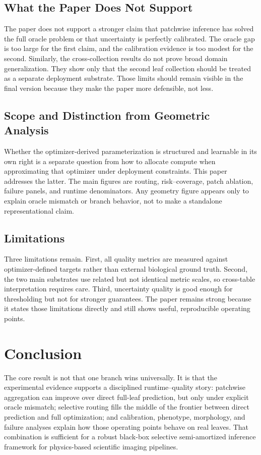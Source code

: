 \documentclass[11pt,a4paper]{article}
\begin{document}
\subsection{What the Paper Does Not Support}
The paper does not support a stronger claim that patchwise inference has solved the full oracle problem or that uncertainty is perfectly calibrated.
The oracle gap is too large for the first claim, and the calibration evidence is too modest for the second.
Similarly, the cross-collection results do not prove broad domain generalization.
They show only that the second leaf collection should be treated as a separate deployment substrate.
Those limits should remain visible in the final version because they make the paper more defensible, not less.

\subsection{Scope and Distinction from Geometric Analysis}
Whether the optimizer-derived parameterization is structured and learnable in its own right is a separate question from how to allocate compute when approximating that optimizer under deployment constraints.
This paper addresses the latter.
The main figures are routing, risk--coverage, patch ablation, failure panels, and runtime denominators.
Any geometry figure appears only to explain oracle mismatch or branch behavior, not to make a standalone representational claim.

\subsection{Limitations}
Three limitations remain.
First, all quality metrics are measured against optimizer-defined targets rather than external biological ground truth.
Second, the two main substrates use related but not identical metric scales, so cross-table interpretation requires care.
Third, uncertainty quality is good enough for thresholding but not for stronger guarantees.
The paper remains strong because it states those limitations directly and still shows useful, reproducible operating points.

\section{Conclusion}
The core result is not that one branch wins universally.
It is that the experimental evidence supports a disciplined runtime--quality story: patchwise aggregation can improve over direct full-leaf prediction, but only under explicit oracle mismatch; selective routing fills the middle of the frontier between direct prediction and full optimization; and calibration, phenotype, morphology, and failure analyses explain how those operating points behave on real leaves.
That combination is sufficient for a robust black-box selective semi-amortized inference framework for physics-based scientific imaging pipelines.
\end{document}
